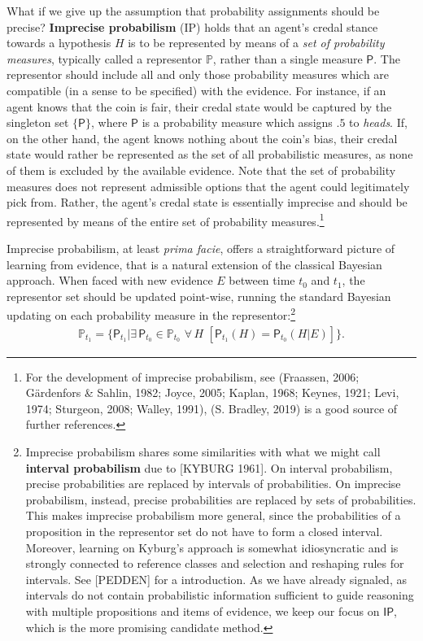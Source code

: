 \documentclass[
  10pt,
  dvipsnames,enabledeprecatedfontcommands]{scrartcl}
\newcommand{\s}[1]{\mbox{$\mathsf{#1}$}}
\begin{document}
What if we give up the assumption that probability assignments should be
precise? \textbf{Imprecise probabilism} (\textsf{IP}) holds that an
agent's credal stance towards a hypothesis \(H\) is to be represented by
means of a \emph{set of probability measures}, typically called a
representor \(\mathbb{P}\), rather than a single measure \(\mathsf{P}\).
The representor should include all and only those probability measures
which are compatible (in a sense to be specified) with the evidence. For
instance, if an agent knows that the coin is fair, their credal state
would be captured by the singleton set \(\{\mathsf{P}\}\), where
\(\mathsf{P}\) is a probability measure which assigns \(.5\) to
\emph{heads}. If, on the other hand, the agent knows nothing about the
coin's bias, their credal state would rather be represented as the set
of all probabilistic measures, as none of them is excluded by the
available evidence. Note that the set of probability measures does not
represent admissible options that the agent could legitimately pick
from. Rather, the agent's credal state is essentially imprecise and
should be represented by means of the entire set of probability
measures.\footnote{For the development of imprecise probabilism, see
  (Fraassen, 2006; Gärdenfors \& Sahlin, 1982; Joyce, 2005; Kaplan,
  1968; Keynes, 1921; Levi, 1974; Sturgeon, 2008; Walley, 1991), (S.
  Bradley, 2019) is a good source of further references.}

Imprecise probabilism, at least \emph{prima facie}, offers a
straightforward picture of learning from evidence, that is a natural
extension of the classical Bayesian approach. When faced with new
evidence \(E\) between time \(t_0\) and \(t_1\), the representor set
should be updated point-wise, running
the
standard Bayesian updating on each probability measure in the
representor:\footnote{Imprecise probabilism shares some similarities
  with what we might call \textbf{interval probabilism} due to {[}KYBURG
  1961{]}. On interval probabilism, precise probabilities are replaced
  by intervals of probabilities. On imprecise probabilism, instead,
  precise probabilities are replaced by sets of probabilities. This
  makes imprecise probabilism more general, since the probabilities of a
  proposition in the representor set do not have to form a closed
  interval. Moreover, learning on Kyburg's approach is somewhat
  idiosyncratic and is strongly connected to reference classes and
  selection and reshaping rules for intervals. See {[}PEDDEN{]} for a
  introduction. As we have already signaled, as intervals do not contain
  probabilistic information sufficient to guide reasoning with multiple
  propositions and items of evidence, we keep our focus on \s{IP}, which
  is the more promising candidate method.}
\begin{align*} \label{eq:updateRepresentor}
\mathbb{P}_{t_1} = \{\mathsf{P}_{t_1}\vert \exists\, {\mathsf{P}_{t_0} \!\in  \mathbb{P}_{t_0}}\,\, \forall\, {H}\,\, \left[\mathsf{P}_{t_1}(H)=\mathsf{P}_{t_0}(H \vert E)\right] \}.
\end{align*}
\end{document}

